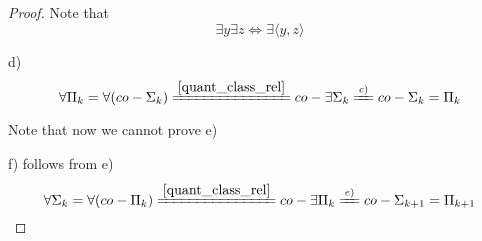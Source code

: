 \begin{proof}
	Note that
	\[ \exists y \exists z \iff \exists \langle y, z \rangle \]

	d)
	\[ \forall \Pi_k = \forall(co-\Sigma_k) \xlongequal{\cref{quant_class_rel}} co-\exists \Sigma_k \xlongequal{c)} co-\Sigma_k = \Pi_k \]

	Note that now we cannot prove e)

	f) follows from e)
	\[ \forall \Sigma_k = \forall(co-\Pi_k) \xlongequal{\cref{quant_class_rel}} co-\exists \Pi_k \xlongequal{e)} co-\Sigma_{k + 1} = \Pi_{k + 1} \]
\end{proof}
